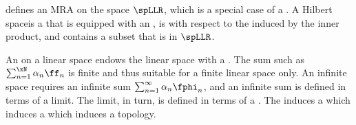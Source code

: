  defines an MRA on the space $\spLLR$, which is a special case of a .
A Hilbert spaceis a that is 
equipped with an ,
is with respect to the 
induced by the inner product,
and contains a subset that is in $\spLLR$.

An  on a linear space endows the linear space with a .
The sum such as $\sum_{n=1}^\xN \alpha_n \ff_n$ is finite and thus suitable for a finite linear space only.
An infinite space requires an infinite sum $\sum_{n=1}^\infty \alpha_n \fphi_n$, and an infinite sum is defined
in terms of a limit.
The limit, in turn, is defined in terms of a .
The  induces a   which induces a 
 which induces a topology.


%


